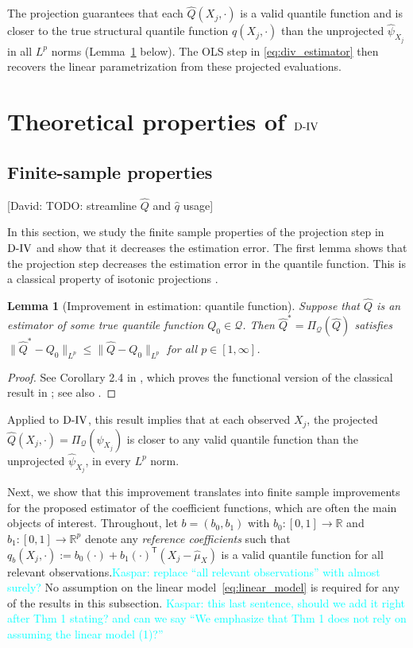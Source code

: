 \documentclass[12pt]{article}
\newcommand{\nddvd}[1]{{\color{blue}[David: #1]}}
\newcommand{\kw}[1]{\textcolor{cyan}{Kaspar: #1}}
\newcommand{\T}{\mathsf{T}} %
\newcommand{\est}{\ensuremath{\textnormal{D-IV}}\xspace}
\newcommand{\R}{\mathbb{R}} %
\newtheorem{lemma}{Lemma}
\begin{document}
The projection guarantees that each $\hat{Q}(X_j, \cdot)$ is a valid quantile function and is closer to the true structural quantile function $q(X_j, \cdot)$ than the unprojected $\hat{\psi}_{X_j}$ in all $L^p$ norms (Lemma~\ref{lemma:improvement} below). The OLS step in \eqref{eq:div_estimator} then recovers the linear parametrization from these projected evaluations. 

\section{Theoretical properties of \est}

\subsection{Finite-sample properties}

\nddvd{TODO: streamline $\hat Q$ and $\hat q$ usage}

In this section, we study the finite sample properties of the projection step in $\est$ and show that it decreases the estimation error. The first lemma shows that the projection step decreases the estimation error in the quantile function. This is a classical property of isotonic projections \citep{Robertson1988}.

\begin{lemma}[Improvement in estimation: quantile function]\label{lemma:improvement}
Suppose that $\hat{Q}$ is an estimator of some true quantile function $Q_0 \in \mathcal{Q}$. Then $\hat{Q}^* = \Pi_{\mathcal{Q}}(\hat{Q})$ satisfies $\| \hat{Q}^*-Q_0\|_{L^p} \leq\|\hat{Q}-Q_0\|_{L^p}$ for all $p \in[1, \infty]$.
\end{lemma}
\begin{proof}
See Corollary 2.4 in \citet{lin2019projection}, which proves the functional version of the classical result in \citet[Theorem 1.6.1]{Robertson1988}; see also \citet[Theorem 2.1]{groeneboom2014nonparametric}.
\end{proof}

Applied to \est, this result implies that at each observed $X_j$, the projected $\hat{Q}(X_j, \cdot) = \Pi_{\mathcal{Q}}(\hat{\psi}_{X_j})$ is closer to any valid quantile function than the unprojected $\hat{\psi}_{X_j}$, in every $L^p$ norm. 

Next, we show that this improvement translates into finite sample improvements for the proposed estimator of the coefficient functions, which are often the main objects of interest. Throughout, let $b=(b_0,b_1)$ with $b_0\colon[0,1]\to\R$ and $b_1\colon[0,1]\to\R^p$ denote any \emph{reference coefficients} such that $q_b(X_j,\cdot):=b_0(\cdot)+b_1(\cdot)^{\!\T}(X_j-\hat\mu_X)$ is a valid quantile function for all relevant observations.\kw{replace ``all relevant observations'' with almost surely?} No assumption on the linear model~\eqref{eq:linear_model} is required for any of the results in this subsection. \kw{this last sentence, should we add it right after Thm 1 stating? and can we say ``We emphasize that Thm 1 does not rely on assuming the linear model (1)?''}
\end{document}
